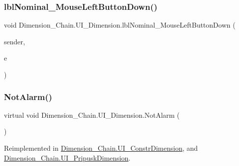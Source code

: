 \subsubsection{\texorpdfstring{lbl\+Nominal\+\_\+\+Mouse\+Left\+Button\+Down()}{lblNominal\_MouseLeftButtonDown()}}
{\footnotesize\ttfamily void Dimension\+\_\+\+Chain.\+U\+I\+\_\+\+Dimension.\+lbl\+Nominal\+\_\+\+Mouse\+Left\+Button\+Down (\begin{DoxyParamCaption}\item[{object}]{sender,  }\item[{Mouse\+Button\+Event\+Args}]{e }\end{DoxyParamCaption})\hspace{0.3cm}{\ttfamily [protected]}}

\mbox{\label{class_dimension___chain_1_1_u_i___dimension_a4ab4c36c068571222229db5f0a194dd2}} 
\subsubsection{\texorpdfstring{Not\+Alarm()}{NotAlarm()}}
{\footnotesize\ttfamily virtual void Dimension\+\_\+\+Chain.\+U\+I\+\_\+\+Dimension.\+Not\+Alarm (\begin{DoxyParamCaption}{ }\end{DoxyParamCaption})\hspace{0.3cm}{\ttfamily [virtual]}}



Reimplemented in \mbox{\hyperlink{class_dimension___chain_1_1_u_i___constr_dimension_ae763eed5acf7a38c8d7c6cb3734ffb16}{Dimension\+\_\+\+Chain.\+U\+I\+\_\+\+Constr\+Dimension}}, and \mbox{\hyperlink{class_dimension___chain_1_1_u_i___pripusk_dimension_af95139063be522fb5f68e5e0c9945ed2}{Dimension\+\_\+\+Chain.\+U\+I\+\_\+\+Pripusk\+Dimension}}.

\mbox{\label{class_dimension___chain_1_1_u_i___dimension_a1973f56d9bd88725bf942bedd6d8d98d}} 
